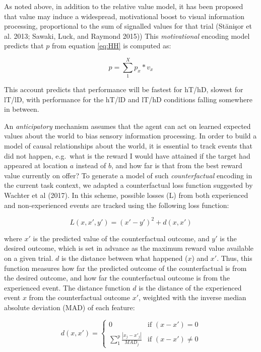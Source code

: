 \documentclass[11pt,halfline,a4paper,]{ouparticle}
\begin{document}
As noted above, in addition to the relative value model, it has been proposed that value may induce a widespread, motivational boost to visual information processing, proportional to the sum of signalled values for that trial (Stănişor et al. 2013; Sawaki, Luck, and Raymond 2015)) This \emph{motivational} encoding model predicts that \(p\) from equation \ref{eq:HH} is computed as:

\begin{equation}\label{eq:motiv}
  p = \sum_{1}^{X} p_x * v_x 
\end{equation}

This account predicts that performance will be fastest for hT/hD, slowest for lT/lD, with performance for the hT/lD and lT/hD conditions falling somewhere in between.

An \emph{anticipatory} mechanism assumes that the agent can act on learned expected values about the world to bias sensory information processing. In order to build a model of causal relationships about the world, it is essential to track events that did not happen, e.g.~what is the reward I would have attained if the target had appeared at location \(a\) instead of \(b\), and how far is that from the best reward value currently on offer? To generate a model of such \emph{counterfactual} encoding in the current task context, we adapted a counterfactual loss function suggested by Wachter et al (2017). In this scheme, possible losses (L) from both experienced and non-experienced events are tracked using the following loss function:

\begin{equation}\label{eq:counterFact}
  L(x, x', y') = (x' - y')^2 + d(x, x')
\end{equation}

where \(x'\) is the predicted value of the counterfactual outcome, and \(y'\) is the desired outcome, which is set in advance as the maximum reward value available on a given trial. \(d\) is the distance between what happened (\(x\)) and \(x'\). Thus, this function measures how far the predicted outcome of the counterfactual is from the desired outcome, and how far the counterfactual outcome is from the experienced event. The distance function \(d\) is the distance of the experienced event \(x\) from the counterfactual outcome \(x'\), weighted with the inverse median absolute deviation (MAD) of each feature:

\begin{equation}\label{eq:d}
  d(x, x') = 
    \begin{cases}
        0 &\text{if } (x - x') = 0 \\
        \sum_{1}^p \frac{|x_j - x'_j|}{MAD_j} &\text{if } (x - x') \neq 0
    \end{cases}
\end{equation}
\end{document}
